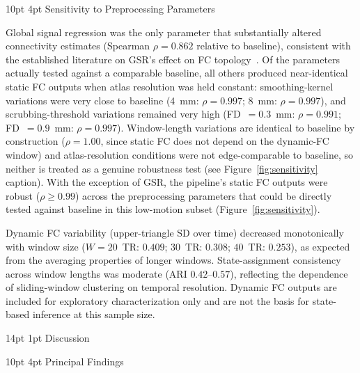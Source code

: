\documentclass[12pt]{article}
\makeatletter
\renewcommand\section{%
  \@startsection{section}{1}{\z@}%
    {14pt \@plus 4pt \@minus 2pt}%
    {1pt}%
    {\normalfont\large\bfseries\color{black}}}
\renewcommand\subsection{%
  \@startsection{subsection}{2}{\z@}%
    {10pt \@plus 2pt \@minus 1pt}%
    {4pt}%
    {\normalfont\normalsize\bfseries}}
\makeatother
\begin{document}
\subsection{Sensitivity to Preprocessing Parameters}

Global signal regression was the only parameter that substantially
altered connectivity estimates (Spearman $\rho = 0.862$ relative to
baseline), consistent with the established literature on GSR's effect
on FC topology~\citep{power2012spurious, murphy2017towards}. Of the
parameters actually tested against a comparable baseline, all others
produced near-identical static FC outputs when atlas resolution was
held constant: smoothing-kernel variations were very close to baseline
(4~mm: $\rho = 0.997$; 8~mm: $\rho = 0.997$), and scrubbing-threshold
variations remained very high (FD~$= 0.3$~mm: $\rho = 0.991$;
FD~$= 0.9$~mm: $\rho = 0.997$). Window-length variations are identical
to baseline by construction ($\rho = 1.00$, since static FC does not
depend on the dynamic-FC window) and atlas-resolution conditions were
not edge-comparable to baseline, so neither is treated as a genuine
robustness test (see Figure~\ref{fig:sensitivity} caption). With the
exception of GSR, the pipeline's static FC outputs were robust
($\rho \geq 0.99$) across the preprocessing parameters that could be
directly tested against baseline in this low-motion subset
(Figure~\ref{fig:sensitivity}).

Dynamic FC variability (upper-triangle SD over time) decreased
monotonically with window size ($W = 20$~TR: $0.409$;
$30$~TR: $0.308$; $40$~TR: $0.253$), as expected from the averaging
properties of longer windows. State-assignment consistency across window
lengths was moderate (ARI $0.42$--$0.57$), reflecting the dependence of
sliding-window clustering on temporal resolution. Dynamic FC outputs are
included for exploratory characterization only and are not the basis for
state-based inference at this sample size.


\section{Discussion}

\subsection{Principal Findings}
\end{document}
